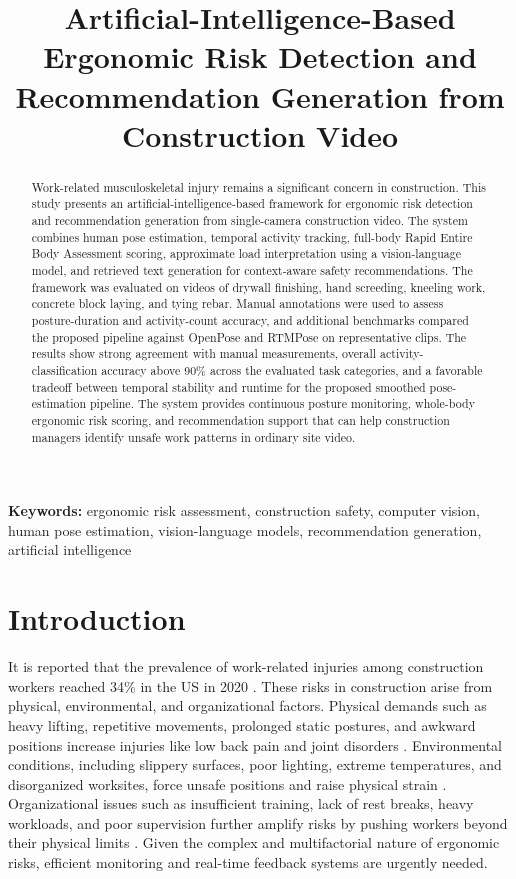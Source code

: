\documentclass[11pt]{article}
\title{Artificial-Intelligence-Based Ergonomic Risk Detection and Recommendation Generation from Construction Video}
\author{}
\date{}
\begin{document}
\linenumbers %

\maketitle    

\begin{abstract}
Work-related musculoskeletal injury remains a significant concern in construction. This study presents an artificial-intelligence-based framework for ergonomic risk detection and recommendation generation from single-camera construction video. The system combines human pose estimation, temporal activity tracking, full-body Rapid Entire Body Assessment scoring, approximate load interpretation using a vision-language model, and retrieved text generation for context-aware safety recommendations. The framework was evaluated on videos of drywall finishing, hand screeding, kneeling work, concrete block laying, and tying rebar. Manual annotations were used to assess posture-duration and activity-count accuracy, and additional benchmarks compared the proposed pipeline against OpenPose and RTMPose on representative clips. The results show strong agreement with manual measurements, overall activity-classification accuracy above 90\% across the evaluated task categories, and a favorable tradeoff between temporal stability and runtime for the proposed smoothed pose-estimation pipeline. The system provides continuous posture monitoring, whole-body ergonomic risk scoring, and recommendation support that can help construction managers identify unsafe work patterns in ordinary site video.
\end{abstract}

\noindent \textbf{Keywords:} ergonomic risk assessment, construction safety, computer vision, human pose estimation, vision-language models, recommendation generation, artificial intelligence

%
%
%

\newpage
\section{Introduction}

It is reported that the prevalence of work-related injuries among construction workers reached 34\% in the US in 2020 \citep{antwi2020construction}. These risks in construction arise from physical, environmental, and organizational factors. Physical demands such as heavy lifting, repetitive movements, prolonged static postures, and awkward positions increase injuries like low back pain and joint disorders \citep{singh2024construction}. Environmental conditions, including slippery surfaces, poor lighting, extreme temperatures, and disorganized worksites, force unsafe positions and raise physical strain \citep{ishwarya2021analysis}. Organizational issues such as insufficient training, lack of rest breaks, heavy workloads, and poor supervision further amplify risks by pushing workers beyond their physical limits \citep{mohan2018identifying}. Given the complex and multifactorial nature of ergonomic risks, efficient monitoring and real-time feedback systems are urgently needed.
\end{document}

